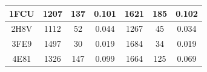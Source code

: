 \begin{table}[H]
{\begin{tabular}{ccccccc}
1FCU                                                              & \multicolumn{1}{c}{1207}                                                                                              & \multicolumn{1}{c}{137}                                                                                                & 0.101                                                                             & \multicolumn{1}{c}{1621}                                                                                              & \multicolumn{1}{c}{185}                                                                                                & 0.102                                                                             \\ \midrule
2H8V                                                              & \multicolumn{1}{c}{1112}                                                                                              & \multicolumn{1}{c}{52}                                                                                                 & 0.044                                                                             & \multicolumn{1}{c}{1267}                                                                                              & \multicolumn{1}{c}{45}                                                                                                 & 0.034                                                                             \\ \midrule
3FE9                                                              & \multicolumn{1}{c}{1497}                                                                                              & \multicolumn{1}{c}{30}                                                                                                 & 0.019                                                                             & \multicolumn{1}{c}{1684}                                                                                              & \multicolumn{1}{c}{34}                                                                                                 & 0.019                                                                             \\ \midrule
4E81                                                              & \multicolumn{1}{c}{1326}                                                                                              & \multicolumn{1}{c}{147}                                                                                                & 0.099                                                                             & \multicolumn{1}{c}{1664}                                                                                              & \multicolumn{1}{c}{125}                                                                                                & 0.069                                                                             \\ \midrule

\end{tabular}}
\end{table}
